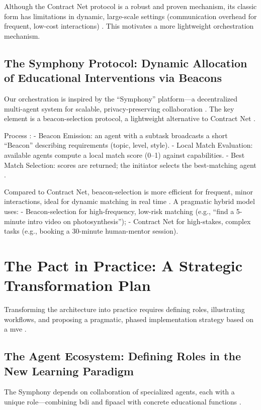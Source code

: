 \documentclass[12pt,a4paper]{article}
\begin{document}
Although the Contract Net protocol is a robust and proven mechanism, its classic form has limitations in dynamic, large-scale settings (communication overhead for frequent, low-cost interactions) \autocite{ohare1998}. This motivates a more lightweight orchestration mechanism.

\subsection{The Symphony Protocol: Dynamic Allocation of Educational Interventions via Beacons}
Our orchestration is inspired by the \enquote{Symphony} platform---a decentralized multi-agent system for scalable, privacy-preserving collaboration \autocite{wang2025,moonlight_symphony,emergent_mind,wang2025_2}. The key element is a beacon-selection protocol, a lightweight alternative to Contract Net \autocite{emergent_mind}.

Process \autocite{wang2025,moonlight_symphony}:
- Beacon Emission: an agent with a subtask broadcasts a short \enquote{Beacon} describing requirements (topic, level, style).
- Local Match Evaluation: available agents compute a local match score (0--1) against capabilities.
- Best Match Selection: scores are returned; the initiator selects the best-matching agent \autocite{moonlight_symphony}.

Compared to Contract Net, beacon-selection is more efficient for frequent, minor interactions, ideal for dynamic matching in real time \autocite{emergent_mind}. A pragmatic hybrid model uses:
- Beacon-selection for high-frequency, low-risk matching (e.g., \enquote{find a 5-minute intro video on photosynthesis});
- Contract Net for high-stakes, complex tasks (e.g., booking a 30-minute human-mentor session).

\section{The Pact in Practice: A Strategic Transformation Plan}
Transforming the architecture into practice requires defining roles, illustrating workflows, and proposing a pragmatic, phased implementation strategy based on a \gls{mve} \autocite{adner2023,adner2023_2,msg_advisors,audi_weihe}.

\subsection{The Agent Ecosystem: Defining Roles in the New Learning Paradigm}
The Symphony depends on collaboration of specialized agents, each with a unique role---combining \gls{bdi} and \gls{fipaacl} with concrete educational functions \autocite{georgeff1998,wiki_bdi,rao_bdi,zhao2025}.
\end{document}
